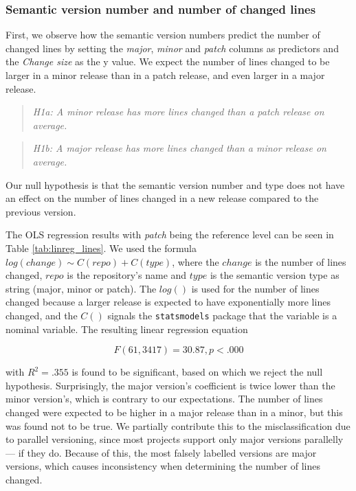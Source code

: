 \subsubsection{Semantic version number and number of changed lines}

First, we observe how the semantic version numbers predict the number of changed lines by setting the \textit{major}, \textit{minor} and \textit{patch} columns as predictors and the \textit{Change size} as the y value. We expect the number of lines changed to be larger in a minor release than in a patch release, and even larger in a major release.

\begin{quote}
    \textit{H1a: A minor release has more lines changed than a patch release on average.}
\end{quote}
\begin{quote}
    \textit{H1b: A major release has more lines changed than a minor release on average.}
\end{quote}

Our null hypothesis is that the semantic version number and type does not have an effect on the number of lines changed in a new release compared to the previous version.

The OLS regression results with \textit{patch} being the reference level can be seen in Table \ref{tab:linreg_lines}. We used the formula $ log(change) \sim C(repo) + C(type) $, where the $change$ is the number of lines changed, $repo$ is the repository's name and $type$ is the semantic version type as string (major, minor or patch). The $log()$ is used for the number of lines changed because a larger release is expected to have exponentially more lines changed, and the $C()$ signals the \texttt{statsmodels} package that the variable is a nominal variable. The resulting linear regression equation 

\[ F(61,3417) = 30.87, p < .000 \]

with $R^2 = .355$ is found to be significant, based on which we reject the null hypothesis. Surprisingly, the major version's coefficient is twice lower than the minor version's, which is contrary to our expectations. The number of lines changed were expected to be higher in a major release than in a minor, but this was found not to be true. We partially contribute this to the misclassification due to parallel versioning, since most projects support only major versions parallelly — if they do. Because of this, the most falsely labelled versions are major versions, which causes inconsistency when determining the number of lines changed.

